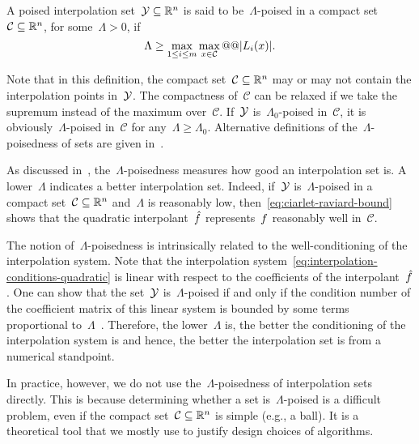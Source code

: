 \begin{definition}
    \label{def:lambda-poisedness}
    A poised interpolation set~$\xpt \subseteq \R^n$ is said to be~$\Lambda$-poised in a compact set~$\mathcal{C} \subseteq \mathbb{R}^n$, for some~$\Lambda > 0$, if
    \begin{equation*}
        \Lambda \ge \max_{1 \le i \le m} \max_{\iter \in \mathcal{C}} @@ \abs{\lagp[i](\iter)}.
    \end{equation*}
\end{definition}

Note that in this definition, the compact set~$\mathcal{C} \subseteq \mathbb{R}^n$ may or may not contain the interpolation points in~$\xpt$.
The compactness of~$\mathcal{C}$ can be relaxed if we take the supremum instead of the maximum over~$\mathcal{C}$.
If~$\xpt$ is~$\Lambda_0$-poised in~$\mathcal{C}$, it is obviously~$\Lambda$-poised in~$\mathcal{C}$ for any~$\Lambda \ge \Lambda_0$.
Alternative definitions of the~$\Lambda$-poisedness of sets are given in~\cite[\S~3.3]{Conn_Scheinberg_Vicente_2009b}.

As discussed in~\cite[\S~3.3]{Conn_Scheinberg_Vicente_2009b}, the~$\Lambda$-poisedness measures how good an interpolation set is.
A lower~$\Lambda$ indicates a better interpolation set.
Indeed, if~$\xpt$ is~$\Lambda$-poised in a compact set~$\mathcal{C} \subseteq \mathbb{R}^n$ and~$\Lambda$ is reasonably low, then~\cref{eq:ciarlet-raviard-bound} shows that the quadratic interpolant~$\objm$ represents~$f$ reasonably well in~$\mathcal{C}$.

The notion of~$\Lambda$-poisedness is intrinsically related to the well-conditioning of the interpolation system.
Note that the interpolation system~\cref{eq:interpolation-conditions-quadratic} is linear with respect to the coefficients of the interpolant~$\objm$.
One can show that the set~$\xpt$ is~$\Lambda$-poised if and only if the condition number of the coefficient matrix of this linear system is bounded by some terms proportional to~$\Lambda$~\cite[Thm.~3.14]{Conn_Scheinberg_Vicente_2009b}.
Therefore, the lower~$\Lambda$ is, the better the conditioning of the interpolation system is and hence, the better the interpolation set is from a numerical standpoint.

In practice, however, we do not use the~$\Lambda$-poisedness of interpolation sets directly.
This is because determining whether a set is~$\Lambda$-poised is a difficult problem, even if the compact set~$\mathcal{C} \subseteq \mathbb{R}^n$ is simple (e.g., a ball).
It is a theoretical tool that we mostly use to justify design choices of algorithms.

